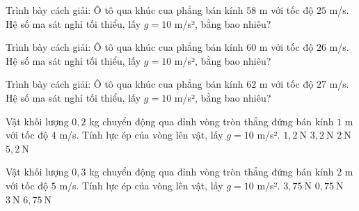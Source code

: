 \begin{bt}
Trình bày cách giải: Ô tô qua khúc cua phẳng bán kính $58$ m với tốc độ $25$ m/s. Hệ số ma sát nghỉ tối thiểu, lấy $g=10$ m/s², bằng bao nhiêu?
\end{bt}

\begin{bt}
Trình bày cách giải: Ô tô qua khúc cua phẳng bán kính $60$ m với tốc độ $26$ m/s. Hệ số ma sát nghỉ tối thiểu, lấy $g=10$ m/s², bằng bao nhiêu?
\end{bt}

\begin{bt}
Trình bày cách giải: Ô tô qua khúc cua phẳng bán kính $62$ m với tốc độ $27$ m/s. Hệ số ma sát nghỉ tối thiểu, lấy $g=10$ m/s², bằng bao nhiêu?
\end{bt}

\begin{ex}
Vật khối lượng $0,2$ kg chuyển động qua đỉnh vòng tròn thẳng đứng bán kính $1$ m với tốc độ $4$ m/s. Tính lực ép của vòng lên vật, lấy $g=10$ m/s².
\choice
{\True $1,2\ \mathrm{N}$}
{$3,2\ \mathrm{N}$}
{$2\ \mathrm{N}$}
{$5,2\ \mathrm{N}$}
\end{ex}

\begin{ex}
Vật khối lượng $0,3$ kg chuyển động qua đỉnh vòng tròn thẳng đứng bán kính $2$ m với tốc độ $5$ m/s. Tính lực ép của vòng lên vật, lấy $g=10$ m/s².
\choice
{$3,75\ \mathrm{N}$}
{\True $0,75\ \mathrm{N}$}
{$3\ \mathrm{N}$}
{$6,75\ \mathrm{N}$}
\end{ex}

